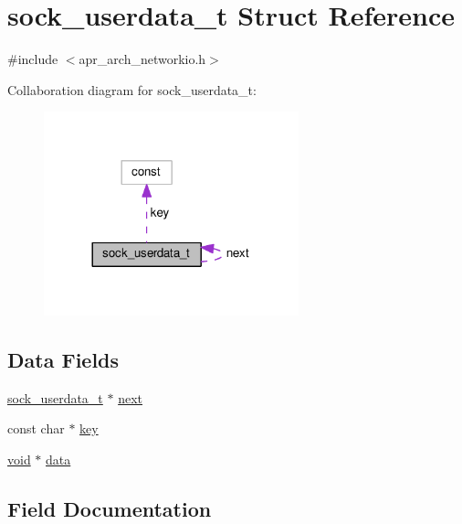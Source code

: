 \hypertarget{structsock__userdata__t}{}\section{sock\+\_\+userdata\+\_\+t Struct Reference}
\label{structsock__userdata__t}


{\ttfamily \#include $<$apr\+\_\+arch\+\_\+networkio.\+h$>$}



Collaboration diagram for sock\+\_\+userdata\+\_\+t\+:
\nopagebreak
\begin{figure}[H]
\begin{center}
\leavevmode
\includegraphics[width=209pt]{structsock__userdata__t__coll__graph}
\end{center}
\end{figure}
\subsection*{Data Fields}
\begin{DoxyCompactItemize}
\item 
\hyperlink{structsock__userdata__t}{sock\+\_\+userdata\+\_\+t} $\ast$ \hyperlink{structsock__userdata__t_a7d67d5d0a6470fe1ad6f39f6810c27d5}{next}
\item 
const char $\ast$ \hyperlink{structsock__userdata__t_a269c5c5398407ad21bc9650d46d12828}{key}
\item 
\hyperlink{group__MOD__ISAPI_gacd6cdbf73df3d9eed42fa493d9b621a6}{void} $\ast$ \hyperlink{structsock__userdata__t_a8f2e13b1566dc2edc2747284afa0736b}{data}
\end{DoxyCompactItemize}


\subsection{Field Documentation}
